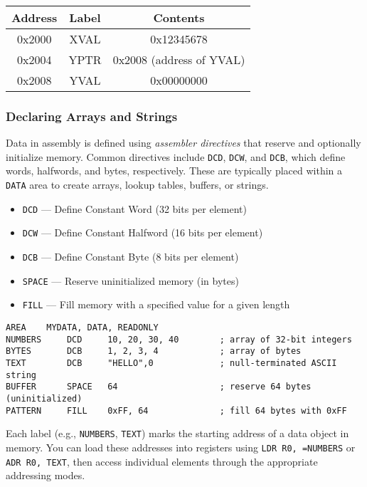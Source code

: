 \begin{center}
\begin{tabular}{|c|c|c|}
\hline
\textbf{Address} & \textbf{Label} & \textbf{Contents} \\
\hline
0x2000 & XVAL & 0x12345678 \\
0x2004 & YPTR & 0x2008 (address of YVAL) \\
0x2008 & YVAL & 0x00000000 \\
\hline
\end{tabular}
\end{center}
\subsubsection{Declaring Arrays and Strings}

Data in assembly is defined using \emph{assembler directives} that reserve and optionally initialize memory.  
Common directives include \texttt{DCD}, \texttt{DCW}, and \texttt{DCB}, which define words, halfwords, and bytes, respectively.  
These are typically placed within a \texttt{DATA} area to create arrays, lookup tables, buffers, or strings.

\begin{itemize}[nosep]
    \item \texttt{DCD} — Define Constant Word (32 bits per element)
    \item \texttt{DCW} — Define Constant Halfword (16 bits per element)
    \item \texttt{DCB} — Define Constant Byte (8 bits per element)
    \item \texttt{SPACE} — Reserve uninitialized memory (in bytes)
    \item \texttt{FILL} — Fill memory with a specified value for a given length
\end{itemize}

\begin{lstlisting}[caption={Declaring arrays and strings in memory}]
            AREA    MYDATA, DATA, READONLY
NUMBERS     DCD     10, 20, 30, 40        ; array of 32-bit integers
BYTES       DCB     1, 2, 3, 4            ; array of bytes
TEXT        DCB     "HELLO",0             ; null-terminated ASCII string
BUFFER      SPACE   64                    ; reserve 64 bytes (uninitialized)
PATTERN     FILL    0xFF, 64              ; fill 64 bytes with 0xFF
\end{lstlisting}

Each label (e.g., \texttt{NUMBERS}, \texttt{TEXT}) marks the starting address of a data object in memory.  
You can load these addresses into registers using \texttt{LDR R0, =NUMBERS} or \texttt{ADR R0, TEXT}, then access individual elements through the appropriate addressing modes.

